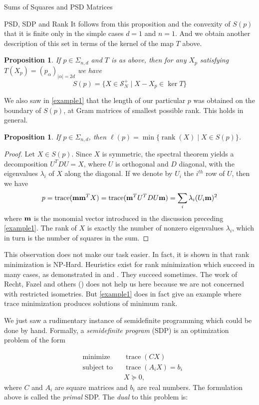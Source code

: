 \documentclass[12pt,oneside,final]{ucthesisucsbmath2010}
\newcommand{\s}{\mathcal{S}}
\newcommand{\snd}{\Sigma_{n,d}}
\DeclareMathOperator{\trace}{trace}
\DeclareMathOperator{\rank}{rank}
\newtheorem{prop}[thm]{Proposition}
\theoremstyle{definition}
\begin{document}
\begin{chapter}{Sums of Squares and PSD Matrices}
\begin{section}{PSD, SDP and Rank}
It follows from this proposition and the convexity of $S(p)$ that it is finite only in the simple cases $d=1$ and $n=1$. And we obtain another description of this set in terms of the kernel of the map $T$ above.

\begin{prop} If $p\in \snd$ and $T$ is as above, then for any $X_p$ satisfying $T(X_p) = (p_\alpha)_{|\alpha|=2d}$ we have
\[S(p) = \{ X \in \s_N^+ \mid X-X_p \in \ker T\}\]
\label{kernelSDP}
\end{prop}

We also saw in \ref{example1} that the length of our particular $p$ was obtained on the boundary of $S(p)$, at Gram matrices of smallest possible rank. This holds in general.

\begin{prop} If $p \in \snd$, then $\ell(p) = \min \{\rank(X)\mid X \in S(p)\}$.
\label{RankLength}
\end{prop}
\begin{proof}
Let $X \in S(p)$. Since $X$ is symmetric, the spectral theorem yields a decomposition $U^TDU=X$, where $U$ is orthogonal and $D$ diagonal, with the eigenvalues $\lambda_i$ of $X$ along the diagonal. If we denote by $U_i$ the $i^{th}$ row of $U$, then we have
\[p =\trace({\bf m}{\bf m}^TX)= \trace({\bf m}^TU^TDU{\bf m})=\sum_i \lambda_i (U_i{\bf m})^2\]
where ${\bf m}$ is the monomial vector introduced in the discussion preceding \ref{example1}. The rank of $X$ is exactly the number of nonzero eigenvalues $\lambda_i$, which in turn is the number of squares in the sum.
\end{proof}

This observation does not make our task easier. In fact, it is shown in \cite{BoydVand} that rank minimization is NP-Hard. Heuristics exist for rank minimization which succeed in many cases, as demonstrated in \cite{FAZ} and \cite{CandTao}. They succeed sometimes. The work of Recht, Fazel and others (\cite{FAZ}) does not help us here because we are not concerned with restricted isometries. But \ref{example1} does in fact give an example where trace minimization produces solutions of minimum rank. 

 We just saw a rudimentary instance of semidefinite programming which could be done by hand. Formally, a \emph{semidefinite program} (SDP) is an optimization problem of the form

\begin{equation*}
\begin{aligned}
& \text{minimize}
& & \trace(CX) \\
& \text{subject to}
& & \trace(A_iX) = b_i\\
&&& X \succeq 0,
\end{aligned}
\end{equation*}
where $C$ and $A_i$ are square matrices and $b_i$ are real numbers. The formulation above is called the \emph{primal} SDP. The \emph{dual} to this problem is:


\end{section}
\end{chapter}
\end{document}
